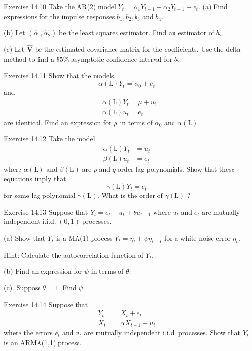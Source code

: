 \documentclass[10pt]{article}
\begin{document}
Exercise 14.10 Take the AR(2) model $Y_{t}=\alpha_{1} Y_{t-1}+\alpha_{2} Y_{t-1}+e_{t}$. (a) Find expressions for the impulse responses $b_{1}, b_{2}, b_{3}$ and $b_{4}$.

(b) Let $\left(\widehat{\alpha}_{1}, \widehat{\alpha}_{2}\right)$ be the least squares estimator. Find an estimator of $b_{2}$.

(c) Let $\widehat{\boldsymbol{V}}$ be the estimated covariance matrix for the coefficients. Use the delta method to find a $95 \%$ asymptotic confidence interval for $b_{2}$.

Exercise 14.11 Show that the models
$$
\alpha(\mathrm{L}) Y_{t}=\alpha_{0}+e_{t}
$$
and
$$
\begin{aligned}
&\alpha(\mathrm{L}) Y_{t}=\mu+u_{t} \\
&\alpha(\mathrm{L}) u_{t}=e_{t}
\end{aligned}
$$
are identical. Find an expression for $\mu$ in terms of $\alpha_{0}$ and $\alpha(\mathrm{L})$.

Exercise 14.12 Take the model
$$
\begin{aligned}
\alpha(\mathrm{L}) Y_{t} &=u_{t} \\
\beta(\mathrm{L}) u_{t} &=e_{t}
\end{aligned}
$$
where $\alpha(\mathrm{L})$ and $\beta(\mathrm{L})$ are $p$ and $q$ order lag polynomials. Show that these equations imply that
$$
\gamma(\mathrm{L}) Y_{t}=e_{t}
$$
for some lag polynomial $\gamma(\mathrm{L})$. What is the order of $\gamma(\mathrm{L})$ ?

Exercise 14.13 Suppose that $Y_{t}=e_{t}+u_{t}+\theta u_{t-1}$ where $u_{t}$ and $e_{t}$ are mutually independent i.i.d. $(0,1)$ processes.

(a) Show that $Y_{t}$ is a MA(1) process $Y_{t}=\eta_{t}+\psi \eta_{t-1}$ for a white noise error $\eta_{t}$.

Hint: Calculate the autocorrelation function of $Y_{t}$.

(b) Find an expression for $\psi$ in terms of $\theta$.

(c) $\operatorname{Suppose} \theta=1$. Find $\psi$.

Exercise 14.14 Suppose that
$$
\begin{aligned}
Y_{t} &=X_{t}+e_{t} \\
X_{t} &=\alpha X_{t-1}+u_{t}
\end{aligned}
$$
where the errors $e_{t}$ and $u_{t}$ are mutually independent i.i.d. processes. Show that $Y_{t}$ is an ARMA(1,1) process.
\end{document}
